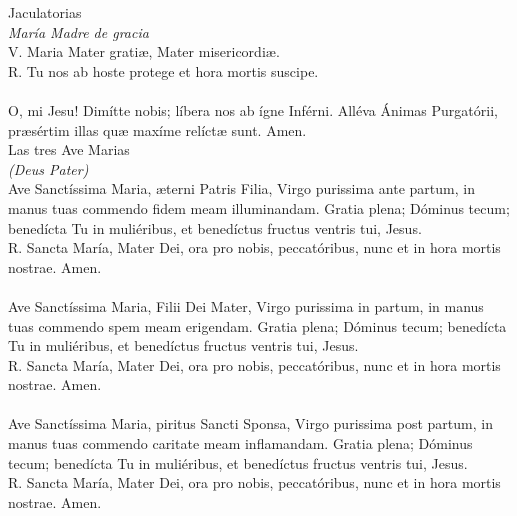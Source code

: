 \documentclass[letterpaper, landscape, 10pt, twocolumn]{article}
\begin{document}
  \Large {\color{red}Jaculatorias}\\
  \normalsize {\color{red} \textit{María Madre de gracia}}\\
  {\color{red}V. M}aria Mater gratiæ, Mater misericordiæ.\\
  {\color{red}R. T}u nos ab hoste protege et hora mortis suscipe.\\

  \\
  {\color{red} O}, mi Jesu! Dimítte nobis; líbera nos ab ígne Inférni. Alléva Ánimas Purgatórii, præsértim illas quæ maxíme relíctæ sunt. {\color{red}A}men.\\

  \Large {\color{red} Las tres Ave Marias}\\
  \normalsize {\color{red} \textit{(Deus Pater)}}\\
  {\color{red} A}ve Sanctíssima Maria, æterni Patris Filia, Virgo purissima ante partum, in manus tuas commendo fidem meam illuminandam. Gratia plena; Dóminus tecum; benedícta Tu in muliéribus, et benedíctus fructus ventris tui, Jesus.\\
  {\color{red} R. S}ancta María, Mater Dei, ora pro nobis, peccatóribus, nunc et in hora mortis nostrae. {\color{red} A}men.\\

  \\
  {\color{red} A}ve Sanctíssima Maria, Filii Dei Mater, Virgo purissima in partum, in manus tuas commendo spem meam erigendam. Gratia plena; Dóminus tecum; benedícta Tu in muliéribus, et benedíctus fructus ventris tui, Jesus.\\
  {\color{red} R. S}ancta María, Mater Dei, ora pro nobis, peccatóribus, nunc et in hora mortis nostrae. {\color{red} A}men.\\

  \\
  {\color{red} A}ve Sanctíssima Maria, piritus Sancti Sponsa, Virgo purissima post partum, in manus tuas commendo caritate meam inflamandam. Gratia plena; Dóminus tecum; benedícta Tu in muliéribus, et benedíctus fructus ventris tui, Jesus.\\
  {\color{red} R. S}ancta María, Mater Dei, ora pro nobis, peccatóribus, nunc et in hora mortis nostrae. {\color{red} A}men.\\
\end{document}
